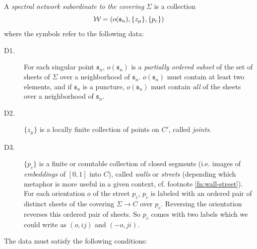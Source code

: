 \documentclass[11pt,a4paper]{article}
\def\wnet {{\cal W}}
\newcommand{\ti}[1]{\textit{#1}}
\def\fs{\mathfrak{s}}
\def\wnet {{\cal W}}
\begin{document}
A \emph{spectral network subordinate to
the covering $\Sigma$} is a collection
\begin{equation}
\wnet = ( o(\mathfrak{s}_n), \{z_\mu\}, \{p_c\} )
\end{equation}
where the symbols refer to the following data:

\begin{description}
\item[D1.] For each singular point $\mathfrak{s}_n$, $o(\mathfrak{s}_n)$
is a \ti{partially ordered subset} of the set of sheets of $\Sigma$
over a neighborhood of $\mathfrak{s}_n$.  $o(\mathfrak{s}_n)$ must contain
at least two elements, and if $\fs_n$ is a puncture, $o(\mathfrak{s}_n)$ must contain
\ti{all} of the sheets over a neighborhood of $\fs_n$.

\item[D2.] $\{z_\mu\}$ is a locally finite collection of points on $C'$, called \emph{joints}.

\item[D3.] $\{p_c\}$ is a finite or countable collection of
closed segments (i.e. images of
\emph{embeddings} of $[0,1]$ into $C$), called \ti{walls} or \emph{streets} (depending
which metaphor is more useful in a given context, cf. footnote \ref{fn:wall-street}).
For each orientation
$o$ of the street $p_c$, $p_c$ is labeled with an ordered pair of distinct sheets of the
covering $\Sigma \to C$ over $p_c$.  Reversing the orientation reverses this ordered pair of sheets.
So $p_c$ comes with two labels which we could
write as $(o, ij)$ and $(-o, ji)$.

\end{description}


The data must satisfy the following conditions:
\end{document}
